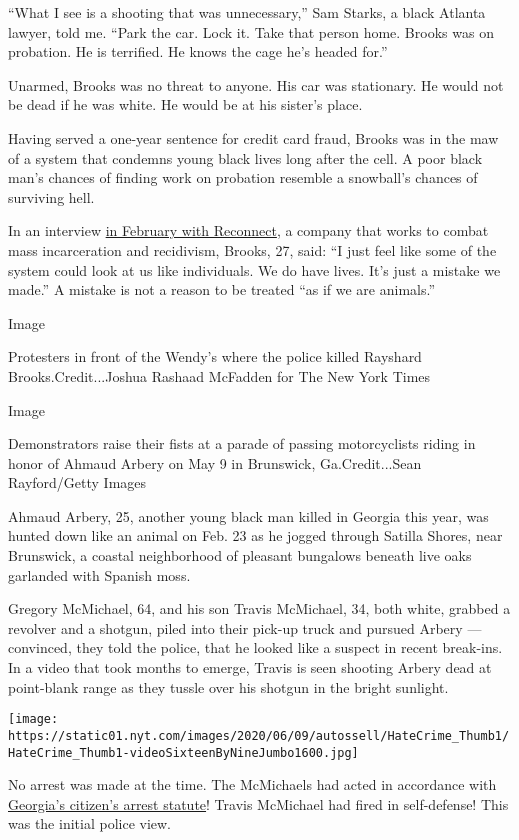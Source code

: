``What I see is a shooting that was unnecessary,'' Sam Starks, a black
Atlanta lawyer, told me. ``Park the car. Lock it. Take that person home.
Brooks was on probation. He is terrified. He knows the cage he's headed
for.''

Unarmed, Brooks was no threat to anyone. His car was stationary. He
would not be dead if he was white. He would be at his sister's place.

Having served a one-year sentence for credit card fraud, Brooks was in
the maw of a system that condemns young black lives long after the cell.
A poor black man's chances of finding work on probation resemble a
snowball's chances of surviving hell.

In an interview
\href{https://www.cnn.com/2020/06/17/us/rayshard-brooks-interview-reconnect-life-after-incarceration/index.html}{in
February with Reconnect}, a company that works to combat mass
incarceration and recidivism, Brooks, 27, said: ``I just feel like some
of the system could look at us like individuals. We do have lives. It's
just a mistake we made.'' A mistake is not a reason to be treated ``as
if we are animals.''

Image

Protesters in front of the Wendy's where the police killed Rayshard
Brooks.Credit...Joshua Rashaad McFadden for The New York Times

Image

Demonstrators raise their fists at a parade of passing motorcyclists
riding in honor of Ahmaud Arbery on May 9 in Brunswick, Ga.Credit...Sean
Rayford/Getty Images

Ahmaud Arbery, 25, another young black man killed in Georgia this year,
was hunted down like an animal on Feb. 23 as he jogged through Satilla
Shores, near Brunswick, a coastal neighborhood of pleasant bungalows
beneath live oaks garlanded with Spanish moss.

Gregory McMichael, 64, and his son Travis McMichael, 34, both white,
grabbed a revolver and a shotgun, piled into their pick-up truck and
pursued Arbery --- convinced, they told the police, that he looked like
a suspect in recent break-ins. In a video that took months to emerge,
Travis is seen shooting Arbery dead at point-blank range as they tussle
over his shotgun in the bright sunlight.

\texttt{[image: https://static01.nyt.com/images/2020/06/09/autossell/HateCrime\_Thumb1/HateCrime\_Thumb1-videoSixteenByNineJumbo1600.jpg]}

No arrest was made at the time. The McMichaels had acted in accordance
with
\href{https://www.nytimes.com/article/ahmaud-arbery-citizen-arrest-law-georgia.html}{Georgia's
citizen's arrest statute}! Travis McMichael had fired in self-defense!
This was the initial police view.

